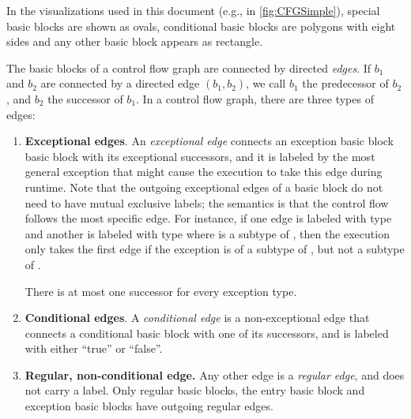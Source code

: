 In the visualizations used in this document (e.g., in \autoref{fig:CFGSimple}), special basic blocks are
shown as ovals, conditional basic blocks are polygons with eight sides and any
other basic block appears as rectangle.

\begin{definition}
\label{def:edges}
The basic blocks of a control flow graph are connected by directed \emph{edges}.
If $b_1$ and $b_2$ are connected by a directed edge $(b_1,b_2)$, we call
$b_1$ the predecessor of $b_2$, and $b_2$ the successor of $b_1$.
In a control flow graph, there are three types of edges:
\begin{enumerate}
    \item \textbf{Exceptional edges}. An \emph{exceptional edge} connects an exception basic block
    basic block with its exceptional successors, and it is labeled by the most
    general exception that might cause the execution to take this edge during runtime.
    Note that the outgoing exceptional edges of a basic block do not need to have mutual
    exclusive labels; the semantics is that the control flow follows the most specific
    edge. For instance, if one edge is labeled with type  and another is labeled
    with type  where  is a subtype of , then the execution only takes
    the first edge if the exception is of a subtype of , but not a subtype of .
    
    There is at most one successor for every exception type.
    \item \textbf{Conditional edges}. A \emph{conditional edge} is a non-exceptional
    edge that connects a conditional
    basic block with one of its successors, and is labeled with either ``true'' or
    ``false''.
    \item \textbf{Regular, non-conditional edge.} Any other edge is a \emph{regular edge}, and does not carry
    a label. Only regular basic blocks, the entry basic block and exception basic blocks have outgoing
    regular edges.
\end{enumerate}
\end{definition}


